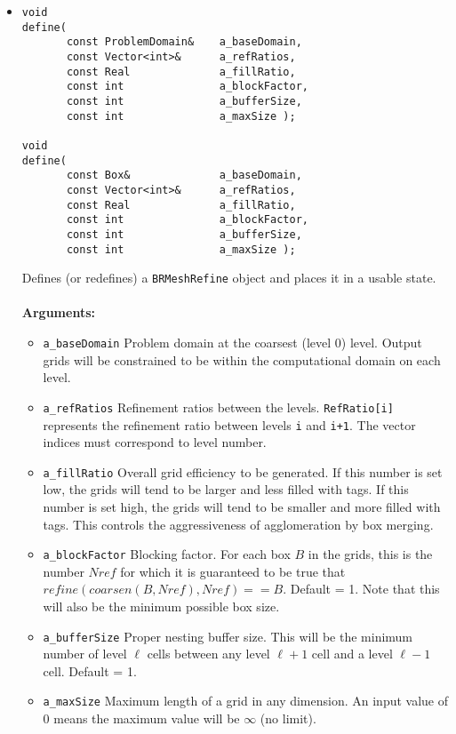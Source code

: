\begin{itemize}
\item
\begin{verbatim}
void
define(
       const ProblemDomain&    a_baseDomain,
       const Vector<int>&      a_refRatios,    
       const Real              a_fillRatio,   
       const int               a_blockFactor, 
       const int               a_bufferSize,  
       const int               a_maxSize );

void
define(
       const Box&              a_baseDomain,
       const Vector<int>&      a_refRatios,    
       const Real              a_fillRatio,   
       const int               a_blockFactor, 
       const int               a_bufferSize,  
       const int               a_maxSize );
\end{verbatim}
Defines (or redefines) a {\tt BRMeshRefine} object and places it in a
usable state. \\
\\
{\bf Arguments:} 
\begin{itemize} 
\item  \verb/a_baseDomain/ Problem domain at the coarsest (level 0)
        level. Output grids will be constrained to be within the
	computational domain on each level.  
\item \verb/a_refRatios/ Refinement ratios between the levels.  
        \verb/RefRatio[i]/ represents the refinement ratio between
        levels {\tt i} and {\tt i+1}.
        The vector indices must correspond to level number.
\item \verb/a_fillRatio/ Overall grid efficiency to be generated.
        If this number is set low, the grids will tend to be
        larger and less filled with tags.  If this number is set high,
        the grids will tend to be smaller and more filled with tags.
        This controls the aggressiveness of agglomeration by
        box merging.
\item \verb/a_blockFactor/ Blocking factor.  For each box $B$ in
        the grids, this is the number $Nref$ 
        for which it is guaranteed to be true that 
        $refine(coarsen(B,Nref),Nref) == B$. Default = 1.
	Note that this will also be the minimum possible
	box size.
\item \verb/a_bufferSize/  Proper nesting buffer size.  This will be the 
	minimum number of level $\ell$ cells between any level
	$\ell+1$ cell and a level $\ell-1$ cell.  Default = 1.
\item \verb/a_maxSize/  Maximum length of a grid in any
	dimension. An input value of 0 means the maximum value will
	be $\infty$ (no limit).
\end{itemize}



\end{itemize}

